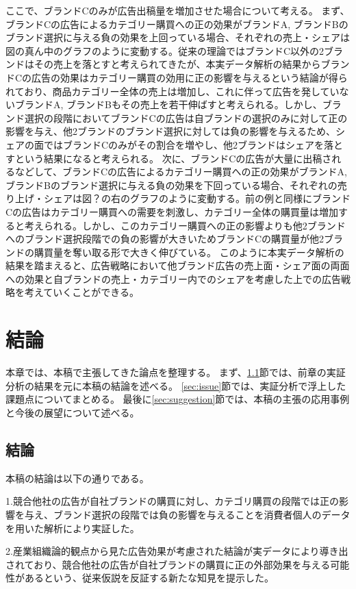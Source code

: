 \documentclass[11pt]{jsarticle}
\begin{document}
ここで、ブランドCのみが広告出稿量を増加させた場合について考える。
まず、ブランドCの広告によるカテゴリー購買への正の効果がブランドA, ブランドBのブランド選択に与える負の効果を上回っている場合、それぞれの売上・シェアは図の真ん中のグラフのように変動する。従来の理論ではブランドC以外の2ブランドはその売上を落とすと考えられてきたが、本実データ解析の結果からブランドCの広告の効果はカテゴリー購買の効用に正の影響を与えるという結論が得られており、商品カテゴリー全体の売上は増加し、これに伴って広告を発していないブランドA, ブランドBもその売上を若干伸ばすと考えられる。しかし、ブランド選択の段階においてブランドCの広告は自ブランドの選択のみに対して正の影響を与え、他2ブランドのブランド選択に対しては負の影響を与えるため、シェアの面ではブランドCのみがその割合を増やし、他2ブランドはシェアを落とすという結果になると考えられる。
次に、ブランドCの広告が大量に出稿されるなどして、ブランドCの広告によるカテゴリー購買への正の効果がブランドA, ブランドBのブランド選択に与える負の効果を下回っている場合、それぞれの売り上げ・シェアは図？の右のグラフのように変動する。前の例と同様にブランドCの広告はカテゴリー購買への需要を刺激し、カテゴリー全体の購買量は増加すると考えられる。しかし、このカテゴリー購買への正の影響よりも他2ブランドへのブランド選択段階での負の影響が大きいためブランドCの購買量が他2ブランドの購買量を奪い取る形で大きく伸びている。
このように本実データ解析の結果を踏まえると、広告戦略において他ブランド広告の売上面・シェア面の両面への効果と自ブランドの売上・カテゴリー内でのシェアを考慮した上での広告戦略を考えていくことができる。

\section{結論}
\label{ch:conclusion}
本章では、本稿で主張してきた論点を整理する。
まず、\ref{sec:conclusion}節では、前章の実証分析の結果を元に本稿の結論を述べる。
\ref{sec:issue}節では、実証分析で浮上した課題点についてまとめる。
最後に\ref{sec:suggestion}節では、本稿の主張の応用事例と今後の展望について述べる。

\subsection{結論}
\label{sec:conclusion}
本稿の結論は以下の通りである。

1.競合他社の広告が自社ブランドの購買に対し、カテゴリ購買の段階では正の影響を与え、ブランド選択の段階では負の影響を与えることを消費者個人のデータを用いた解析により実証した。

2.産業組織論的観点から見た広告効果が考慮された結論が実データにより導き出されており、競合他社の広告が自社ブランドの購買に正の外部効果を与える可能性があるという、従来仮説を反証する新たな知見を提示した。
\end{document}
